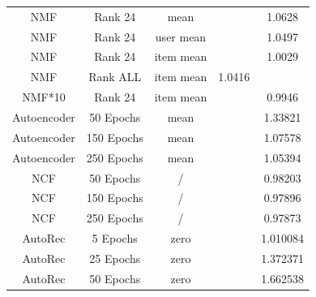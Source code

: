 \documentclass[10pt,conference,compsocconf]{IEEEtran}
\begin{document}
\begin{table}
{\begin{tabular}{|| c | c | c | c | c ||}
                \hline
                NMF               & Rank 24                & mean                    &                        & 1.0628                  \\
                NMF               & Rank 24                & user mean               &                        & 1.0497                  \\
                NMF               & Rank 24                & item mean               &                        & 1.0029                  \\
                NMF               & Rank ALL               & item mean               & 1.0416                 &                         \\
                NMF*10            & Rank 24                & item mean               &                        & 0.9946                  \\
                \hline
                Autoencoder       & 50 Epochs                         & mean                    &                        & 1.33821                 \\
                Autoencoder       & 150 Epochs                        & mean                    &                        & 1.07578                 \\
                Autoencoder       & 250 Epochs                        & mean                    &                        & 1.05394                 \\
                \hline
                NCF               & 50 Epochs                         & /                       &                        & 0.98203                 \\
                NCF               & 150 Epochs                        & /                       &                        & 0.97896                 \\
                NCF               & 250 Epochs                        & /                       &                        & 0.97873                 \\
                \hline
                AutoRec           & 5 Epochs                          & zero                    &                        & 1.010084                \\
                AutoRec           & 25 Epochs                         & zero                    &                        & 1.372371                \\
                AutoRec           & 50 Epochs                         & zero                    &                        & 1.662538                \\

\end{tabular}}
\end{table}
\end{document}
